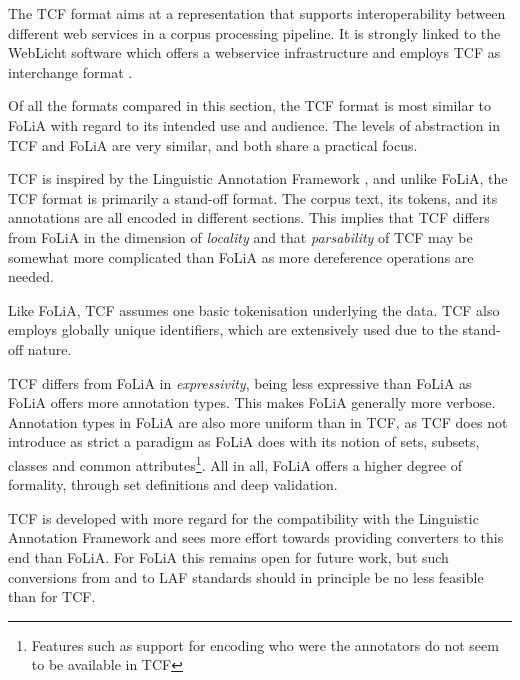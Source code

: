 \documentclass[a4paper,10pt,twoside]{article}
\begin{document}
The TCF format aims at a representation that supports interoperability between
different web services in a corpus processing pipeline. It is strongly linked to
the WebLicht software which offers a webservice infrastructure and employs
TCF as interchange format \cite{WEBLICHT}.

Of all the formats compared in this section, the TCF format is most similar to
FoLiA with regard to its intended use and audience. The levels of abstraction in
TCF and FoLiA are very similar, and both share a practical focus.

TCF is inspired by the Linguistic Annotation Framework \cite{LAF}, and unlike
FoLiA, the TCF format is primarily a stand-off format. The corpus text, its
tokens, and its annotations are all encoded in different sections.  This
implies that TCF differs from FoLiA in the dimension of \emph{locality} and
that \emph{parsability} of TCF may be somewhat more complicated than FoLiA as more
dereference operations are needed.


Like FoLiA, TCF assumes one basic tokenisation underlying the data. TCF also
employs globally unique identifiers, which are extensively used due to the
stand-off nature.

TCF differs from FoLiA in \emph{expressivity}, being less expressive than FoLiA
as FoLiA offers more annotation types. This makes FoLiA generally more verbose.
Annotation types in FoLiA are also more uniform than in TCF, as TCF does not
introduce as strict a paradigm as FoLiA does with its notion of sets, subsets,
classes and common attributes\footnote{Features such as support for encoding
who were the annotators do not seem to be available in TCF}.  All in all, FoLiA
offers a higher degree of formality, through set definitions and deep
validation.

TCF is developed with more regard for the compatibility with the Linguistic
Annotation Framework \cite{LAF} and sees more effort towards providing converters to this end
than FoLiA. For FoLiA this remains open for future work, but such conversions
from and to LAF standards should in principle be no less feasible than for TCF.

\end{document}
